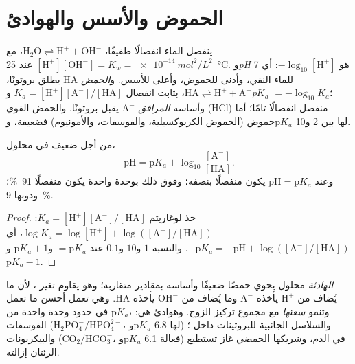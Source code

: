 \section{الحموض والأسس والهوادئ}

\begin{definition}\label{def:b1:water-small-molecules:ph}
ينفصل الماء انفصالًا طفيفًا، $\mathrm{H_2O} \rightleftharpoons
\mathrm{H^+} + \mathrm{OH^-}$، مع $[\mathrm{H^+}][\mathrm{OH^-}] =
K_w = \qty{e-14}{mol^2/L^2}$ عند \qty{25}{\celsius}. و\emph{pH}
هو $-\log_{10}[\mathrm{H^+}]$: أي 7 للماء النقي، وأدنى للحموض، وأعلى
للأسس. و\emph{الحمض} $\mathrm{HA}$ يطلق بروتونًا،
$\mathrm{HA} \rightleftharpoons \mathrm{H^+} +
\mathrm{A^-}$، بثابت
انفصال $K_a =
[\mathrm{H^+}][\mathrm{A^-}]/[\mathrm{HA}]$
و\emph{p$K_a$} $= -\log_{10}K_a$؛ وأساسه
\emph{المرافق} $\mathrm{A^-}$ يقبل بروتونًا. والحمض القوي
(HCl) منفصل انفصالًا تامًا؛ أما حموض  (الحموض الكربوكسيلية،
والفوسفات، والأمونيوم) فضعيفة، وp$K_a$ لها بين 2 و10.
\end{definition}

\begin{theorem}\label{thm:b1:water-small-molecules:hh}
من أجل  ضعيف في محلول،
\[
\mathrm{pH} = \mathrm{p}K_a + \log_{10}\frac{[\mathrm{A^-}]}{[\mathrm{HA}]} .
\]
وعند $\mathrm{pH} = \mathrm{p}K_a$ يكون  منفصلًا بنصفه؛ وفوق
ذلك بوحدة  واحدة يكون منفصلًا \qty{91}{\%}؛ ودونها \qty{9}{\%}.
\end{theorem}
\begin{proof}
خذ لوغاريتم $K_a = [\mathrm{H^+}][\mathrm{A^-}]/[\mathrm{HA}]$:
$\log K_a = \log[\mathrm{H^+}] + \log([\mathrm{A^-}]/[\mathrm{HA}])$،
أي $-\mathrm{p}K_a = -\mathrm{pH} + \log([\mathrm{A^-}]/[\mathrm{HA}])$.
والنسبة $1$ و$10$ و$0.1$ عند  $= \mathrm{p}K_a$ و$\mathrm{p}K_a + 1$
و$\mathrm{p}K_a - 1$.
\end{proof}

\begin{definition}[الهادئة]\label{def:b1:water-small-molecules:buffer}
\emph{الهادئة} محلول يحوي حمضًا ضعيفًا وأساسه 
بمقادير متقاربة؛ وهو يقاوم تغير ، لأن ما يُضاف من $\mathrm{H^+}$
يأخذه $\mathrm{A^-}$ وما يُضاف من $\mathrm{OH^-}$ يأخذه
$\mathrm{HA}$. وهي تعمل أحسن ما تعمل في حدود وحدة واحدة من
p$K_a$، وتنمو \emph{سعتها} مع مجموع تركيز الزوج. وهوادئ  هي:
الفوسفات ($\mathrm{H_2PO_4^-}/\mathrm{HPO_4^{2-}}$، وp$K_a$ لها 6.8)
والسلاسل الجانبية للبروتينات داخل ؛ والبيكربونات
($\mathrm{CO_2}/\mathrm{HCO_3^-}$، وp$K_a$ فعالة 6.1) في الدم،
وشريكها الحمضي غاز تستطيع الرئتان إزالته.
\end{definition}

